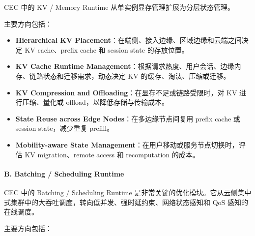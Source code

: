 \documentclass[a4paper,twocolumn,10pt]{ctexart}
\begin{document}
CEC 中的 KV / Memory Runtime 从单实例显存管理扩展为分层状态管理。




主要方向包括：




\begin{itemize}
\item \textbf{Hierarchical KV Placement}：在端侧、接入边缘、区域边缘和云端之间决定 KV cache、prefix cache 和 session state 的存放位置。

\item \textbf{KV Cache Runtime Management}：根据请求热度、用户会话、边缘内存、链路状态和迁移需求，动态决定 KV 的缓存、淘汰、压缩或迁移。

\item \textbf{KV Compression and Offloading}：在显存不足或链路受限时，对 KV 进行压缩、量化或 offload，以降低存储与传输成本。

\item \textbf{State Reuse across Edge Nodes}：在多边缘节点间复用 prefix cache 或 session state，减少重复 prefill。

\item \textbf{Mobility-aware State Management}：在用户移动或服务节点切换时，评估 KV migration、remote access 和 recomputation 的成本。



\end{itemize}
\paragraph*{B. Batching / Scheduling Runtime}



CEC 中的 Batching / Scheduling Runtime 是非常关键的优化模块。它从云侧集中式集群中的大吞吐调度，转向低并发、强时延约束、网络状态感知和 QoS 感知的在线调度。




主要方向包括：
\end{document}
